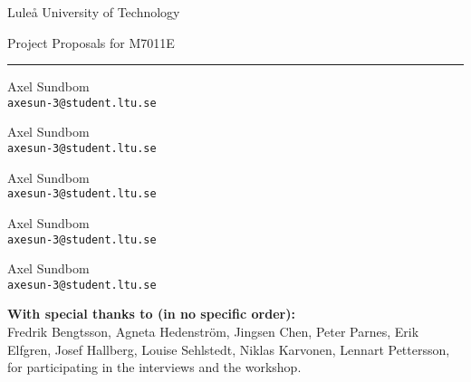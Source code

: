 \centering

{\Huge Luleå University of Technology}\par
\vspace{1ex}
{\Large Project Proposals for M7011E}\par
\rule{.5\textwidth}{.4pt}

\vspace{4ex}
\begin{minipage}{.3\textwidth}
\raggedright
Axel Sundbom\\
\texttt{axesun-3@student.ltu.se}
\end{minipage}
\begin{minipage}{.3\textwidth}
\raggedleft
Axel Sundbom\\
\texttt{axesun-3@student.ltu.se}
\end{minipage}

\vspace{4ex}
\begin{minipage}{.3\textwidth}
\raggedright
Axel Sundbom\\
\texttt{axesun-3@student.ltu.se}
\end{minipage}
\begin{minipage}{.3\textwidth}
\raggedleft
Axel Sundbom\\
\texttt{axesun-3@student.ltu.se}
\end{minipage}

\vspace{4ex}
\begin{minipage}{.3\textwidth}
\centering
Axel Sundbom\\
\texttt{axesun-3@student.ltu.se}
\end{minipage}

\vspace{12ex}
\begin{abstract}
This document describes some programming project assignments for the course M7011E that came out of a fifth year project for computer engineering students. Most of these assignments are results of interviews with examiners and suggestions from a workshop that was heldas a part of the pre-study. You may redistribute this document under the terms and agreements of the MIT license.
\end{abstract}

\tableofcontents
\vfill
\textbf{With special thanks to (in no specific order):}\\
Fredrik Bengtsson, Agneta Hedenström, Jingsen Chen, Peter Parnes, Erik Elfgren, Josef Hallberg, Louise Sehlstedt, Niklas Karvonen, Lennart Pettersson, for participating in the interviews and the workshop.
